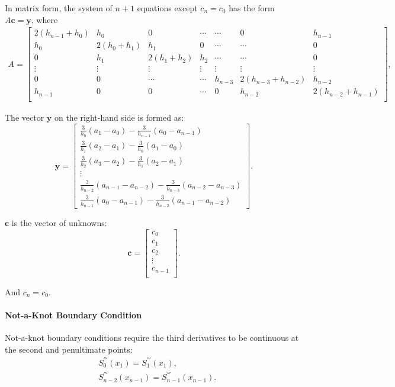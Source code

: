 \documentclass[a4paper]{article}
\begin{document}
\begin{sloppypar}
In matrix form, the system of $n+1$ equations except $c_n=c_0$ has the form $A\mathbf{c} = \mathbf{y}$, where
$$
\begin{aligned}
A = \begin{bmatrix}
2(h_{n-1}+h_0) & h_0 & 0  & \cdots& \cdots & 0 & h_{n-1} \\
h_0 & 2(h_0 + h_1) & h_1 & 0 & \cdots& \cdots & 0 \\
0 & h_1 & 2(h_1 + h_2) & h_2 & \cdots& \cdots & 0 \\
\vdots & \vdots & \vdots & \vdots & \vdots & \vdots &\vdots\\
0 & 0 & \cdots &  \cdots & h_{n-3} & 2(h_{n-3}+h_{n-2}) &  h_{n-2} \\
h_{n-1} & 0 & 0 & \cdots & 0& h_{n-2} & 2(h_{n-2} + h_{n-1})  \\
\end{bmatrix},
\end{aligned}
$$

The vector \(\mathbf{y}\) on the right-hand side is formed as:
\[
\mathbf{y} = \begin{bmatrix}
\frac3{h_0}(a_{1}-a_0)-\frac3{h_{n-1}}(a_0-a_{n-1}) \\
\frac{3}{h_1}(a_2 - a_1) - \frac{3}{h_0}(a_1 - a_0) \\
\frac{3}{h_2}(a_3 - a_2) - \frac{3}{h_1}(a_2 - a_1) \\
\vdots \\
\frac{3}{h_{n-2}}(a_{n-1} - a_{n-2}) - \frac{3}{h_{n-3}}(a_{n-2} - a_{n-3}) \\
\frac3{h_{n-1}}(a_{0}-a_{n-1})-\frac3{h_{n-2}}(a_{n-1}-a_{n-2})
\end{bmatrix}.
\]

\(\mathbf{c}\) is the vector of unknowns:
\[
\mathbf{c} = \begin{bmatrix}
c_0 \\
c_1 \\
c_2 \\
\vdots \\
c_{n-1} \\
\end{bmatrix}.
\]

And $c_n=c_0$.


\paragraph*{Not-a-Knot Boundary Condition}
Not-a-knot boundary conditions require the third derivatives to be continuous at the second and penultimate points:
$$
\begin{aligned}
  &S_0^{'''}(x_1)=S_1^{'''}(x_1),\\
  &S_{n-2}^{'''}(x_{n-1})=S_{n-1}^{'''}(x_{n-1}).
\end{aligned}$$


\end{sloppypar}
\end{document}
